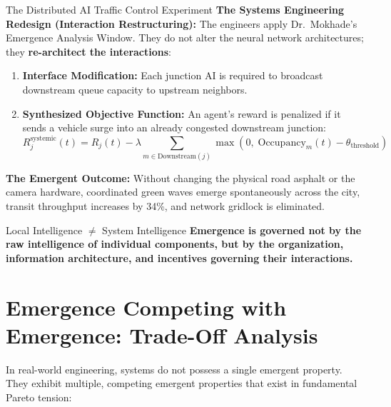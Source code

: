 \begin{examplebox}{The Distributed AI Traffic Control Experiment}
\textbf{The Systems Engineering Redesign (Interaction Restructuring):}
The engineers apply Dr.~Mokhade's Emergence Analysis Window. They do not alter the neural network architectures; they \textbf{re-architect the interactions}:
\begin{enumerate}[leftmargin=1.5em]
    \item \textbf{Interface Modification:} Each junction AI is required to broadcast downstream queue capacity to upstream neighbors.
    \item \textbf{Synthesized Objective Function:} An agent's reward is penalized if it sends a vehicle surge into an already congested downstream junction:
    \begin{equation}
        R_j^{\text{systemic}}(t) = R_j(t) - \lambda \sum_{m \in \text{Downstream}(j)} \max\left(0, \; \text{Occupancy}_m(t) - \theta_{\text{threshold}}\right)
    \end{equation}
\end{enumerate}
\textbf{The Emergent Outcome:} Without changing the physical road asphalt or the camera hardware, coordinated green waves emerge spontaneously across the city, transit throughput increases by 34\%, and network gridlock is eliminated.
\end{examplebox}

\begin{takeawaybox}{Local Intelligence $\neq$ System Intelligence}
\textbf{Emergence is governed not by the raw intelligence of individual components, but by the organization, information architecture, and incentives governing their interactions.}
\end{takeawaybox}

\section{Emergence Competing with Emergence: Trade-Off Analysis}
\label{sec:competing_emergence}

In real-world engineering, systems do not possess a single emergent property. They exhibit multiple, competing emergent properties that exist in fundamental Pareto tension:

